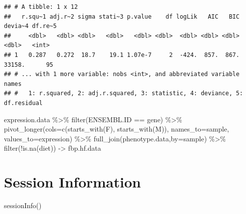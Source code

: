 \documentclass[
]{article}
\newenvironment{Shaded}{\begin{snugshade}}{\end{snugshade}}
\newcommand{\AttributeTok}[1]{\textcolor[rgb]{0.77,0.63,0.00}{#1}}
\newcommand{\FunctionTok}[1]{\textcolor[rgb]{0.00,0.00,0.00}{#1}}
\newcommand{\NormalTok}[1]{#1}
\newcommand{\OtherTok}[1]{\textcolor[rgb]{0.56,0.35,0.01}{#1}}
\newcommand{\SpecialCharTok}[1]{\textcolor[rgb]{0.00,0.00,0.00}{#1}}
\newcommand{\StringTok}[1]{\textcolor[rgb]{0.31,0.60,0.02}{#1}}
\begin{document}
\begin{verbatim}
## # A tibble: 1 x 12
##   r.squ~1 adj.r~2 sigma stati~3 p.value    df logLik   AIC   BIC devia~4 df.re~5
##     <dbl>   <dbl> <dbl>   <dbl>   <dbl> <dbl>  <dbl> <dbl> <dbl>   <dbl>   <int>
## 1   0.287   0.272  18.7    19.1 1.07e-7     2  -424.  857.  867.  33158.      95
## # ... with 1 more variable: nobs <int>, and abbreviated variable names
## #   1: r.squared, 2: adj.r.squared, 3: statistic, 4: deviance, 5: df.residual
\end{verbatim}

\begin{Shaded}
\begin{Highlighting}[]
\NormalTok{expression.data }\SpecialCharTok{\%\textgreater{}\%}
  \FunctionTok{filter}\NormalTok{(ENSEMBL.ID }\SpecialCharTok{==}\NormalTok{ gene) }\SpecialCharTok{\%\textgreater{}\%}
  \FunctionTok{pivot\_longer}\NormalTok{(}\AttributeTok{cols=}\FunctionTok{c}\NormalTok{(}\FunctionTok{starts\_with}\NormalTok{(}\StringTok{\textquotesingle{}F\textquotesingle{}}\NormalTok{),}
                      \FunctionTok{starts\_with}\NormalTok{(}\StringTok{\textquotesingle{}M\textquotesingle{}}\NormalTok{)),}
               \AttributeTok{names\_to=}\StringTok{\textquotesingle{}sample\textquotesingle{}}\NormalTok{,}
               \AttributeTok{values\_to=}\StringTok{\textquotesingle{}expression\textquotesingle{}}\NormalTok{) }\SpecialCharTok{\%\textgreater{}\%}
  \FunctionTok{full\_join}\NormalTok{(phenotype.data,}\AttributeTok{by=}\StringTok{\textquotesingle{}sample\textquotesingle{}}\NormalTok{) }\SpecialCharTok{\%\textgreater{}\%}
  \FunctionTok{filter}\NormalTok{(}\SpecialCharTok{!}\FunctionTok{is.na}\NormalTok{(diet)) }\OtherTok{{-}\textgreater{}}\NormalTok{ fbp.hf.data}
\end{Highlighting}
\end{Shaded}

\hypertarget{session-information}{%
\section{Session Information}\label{session-information}}

\begin{Shaded}
\begin{Highlighting}[]
\FunctionTok{sessionInfo}\NormalTok{()}
\end{Highlighting}
\end{Shaded}
\end{document}
